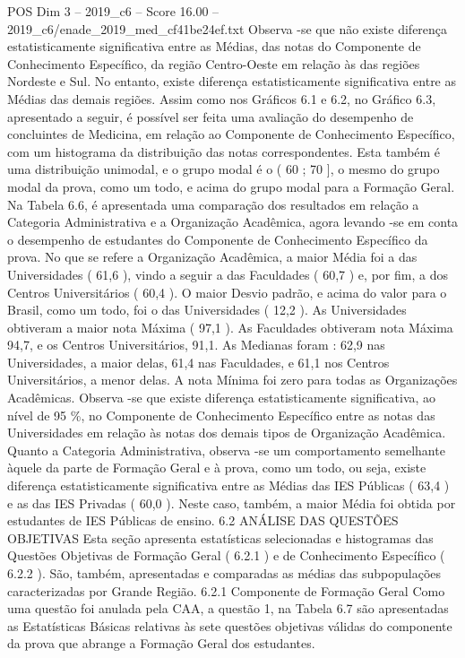 \begin{textsample}{POS Dim 3 – 2019\_c6 – Score 16.00 – 2019\_c6/enade\_2019\_med\_cf41be24ef.txt}
Observa -se que não existe diferença estatisticamente significativa entre as Médias, das notas do Componente de Conhecimento Específico, da região Centro-Oeste em relação às das regiões Nordeste e Sul.
No entanto, existe diferença estatisticamente significativa entre as Médias das demais regiões.
Assim como nos Gráficos 6.1 e 6.2, no Gráfico 6.3, apresentado a seguir, é possível ser feita uma avaliação do desempenho de concluintes de Medicina, em relação ao Componente de Conhecimento Específico, com um histograma da distribuição das notas correspondentes.
Esta também é uma distribuição unimodal, e o grupo modal é o ( 60 ; 70 ], o mesmo do grupo modal da prova, como um todo, e acima do grupo modal para a Formação Geral.
Na Tabela 6.6, é apresentada uma comparação dos resultados em relação a Categoria Administrativa e a Organização Acadêmica, agora levando -se em conta o desempenho de estudantes do Componente de Conhecimento Específico da prova.
No que se refere a Organização Acadêmica, a maior Média foi a das Universidades ( 61,6 ), vindo a seguir a das Faculdades ( 60,7 ) e, por fim, a dos Centros Universitários ( 60,4 ).
O maior Desvio padrão, e acima do valor para o Brasil, como um todo, foi o das Universidades ( 12,2 ).
As Universidades obtiveram a maior nota Máxima ( 97,1 ).
As Faculdades obtiveram nota Máxima 94,7, e os Centros Universitários, 91,1.
As Medianas foram : 62,9 nas Universidades, a maior delas, 61,4 nas Faculdades, e 61,1 nos Centros Universitários, a menor delas.
A nota Mínima foi zero para todas as Organizações Acadêmicas.
Observa -se que existe diferença estatisticamente significativa, ao nível de 95 \%, no Componente de Conhecimento Específico entre as notas das Universidades em relação às notas dos demais tipos de Organização Acadêmica.
Quanto a Categoria Administrativa, observa -se um comportamento semelhante àquele da parte de Formação Geral e à prova, como um todo, ou seja, existe diferença estatisticamente significativa entre as Médias das IES Públicas ( 63,4 ) e as das IES Privadas ( 60,0 ).
Neste caso, também, a maior Média foi obtida por estudantes de IES Públicas de ensino. 6.2 ANÁLISE DAS QUESTÕES OBJETIVAS Esta seção apresenta estatísticas selecionadas e histogramas das Questões Objetivas de Formação Geral ( 6.2.1 ) e de Conhecimento Específico ( 6.2.2 ).
São, também, apresentadas e comparadas as médias das subpopulações caracterizadas por Grande Região. 6.2.1 Componente de Formação Geral Como uma questão foi anulada pela CAA, a questão 1, na Tabela 6.7 são apresentadas as Estatísticas Básicas relativas às sete questões objetivas válidas do componente da prova que abrange a Formação Geral dos estudantes.

\end{textsample}
